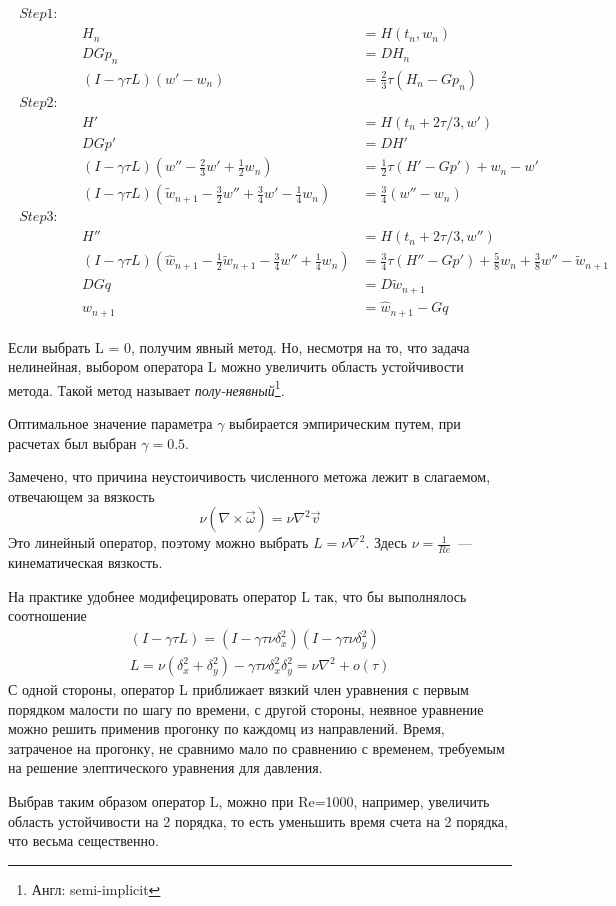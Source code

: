\begin{gather}
\begin{align*}
Step 1:& \\
&&H_n &= H(t_n, w_n) \\
&&DGp_n &= DH_n \\
&&(I - \gamma \tau L)(w' - w_n) &= \frac{2}{3} \tau (H_n - Gp_n) \\
%
Step 2:& \\
&&H' &= H(t_n + 2\tau/3, w') \\
&&DGp' &= DH' \\
&&(I - \gamma \tau L)(w'' - \frac{2}{3}w' + \frac{1}{2}w_n) &= \frac{1}{2} \tau (H' - Gp') + w_n - w' \\
&&(I - \gamma \tau L)(\tilde w_{n+1} - \frac{3}{2}w'' + \frac{3}{4}w' - \frac{1}{4}w_n) &= \frac{3}{4}(w'' - w_n)\\
%
Step 3:& \\
&&H'' &= H(t_n + 2\tau/3, w'') \\
&&(I - \gamma \tau L)(\hat w_{n+1} - \frac{1}{2} \tilde w_{n+1} - \frac{3}{4}w'' + \frac{1}{4}w_n) &= \frac{3}{4} \tau (H'' - Gp') + 
	\frac{5}{8}w_n + \frac{3}{8}w'' - \tilde w_{n+1} \\
&&DGq &= D\tilde w_{n+1} \\
&&w_{n+1} &= \hat w_{n+1} - Gq
\end{align*}
\end{gather}

Если выбрать L = 0, получим явный метод. Но, несмотря на то, что задача нелинейная, выбором оператора L можно увеличить область устойчивости метода. Такой метод называет \textit{полу-неявный}\footnote{Англ: semi-implicit}. 

Оптимальное значение параметра $\gamma$ выбирается эмпирическим путем, при расчетах был выбран $\gamma=0.5$. 

Замечено, что причина неустоичивость численного метожа лежит в слагаемом, отвечающем за вязкость$$
	\nu (\nabla \times \vec \omega) = \nu \nabla ^2 \vec v
$$ Это линейный оператор, поэтому можно выбрать $L = \nu \nabla^2$. Здесь $\nu = \frac{1}{Re}$~--- кинематическая вязкость. 

На практике удобнее модифецировать оператор L так, что бы выполнялось соотношение
\begin{gather*}
	(I - \gamma \tau L) = (I - \gamma \tau \nu \delta_x^2)(I - \gamma \tau \nu \delta_y^2) \\
	L =  \nu (\delta_x^2 + \delta_y^2) - \gamma \tau \nu \delta_x^2 \delta_y^2 = \nu \nabla^2 + o(\tau)
\end{gather*}
С одной стороны, оператор L приближает вязкий член уравнения с первым порядком малости по шагу по времени, с другой стороны, неявное уравнение можно решить применив прогонку по каждомц из направлений. Время, затраченое на прогонку, не сравнимо мало по сравнению с временем, требуемым на решение элептического уравнения для давления. 

Выбрав таким образом оператор L, можно при Re=1000, например, увеличить область устойчивости на 2 порядка, то есть уменьшить время счета на 2 порядка, что весьма сещественно. 


\newpage

